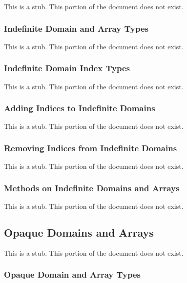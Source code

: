 This is a stub.  This portion of the document does not exist.

\subsubsection{Indefinite Domain and Array Types}
\label{Indefinite_Domain_and_Array_Types}

This is a stub.  This portion of the document does not exist.

\subsubsection{Indefinite Domain Index Types}
\label{Indefinite_Domain_Index_Types}

This is a stub.  This portion of the document does not exist.

\subsubsection{Adding Indices to Indefinite Domains}
\label{Adding_Indices_to_Indefinite_Domains}

This is a stub.  This portion of the document does not exist.

\subsubsection{Removing Indices from Indefinite Domains}
\label{Removing_Indices_from_Indefinite_Domains}

This is a stub.  This portion of the document does not exist.

\subsubsection{Methods on Indefinite Domains and Arrays}
\label{Methods_on_Indefinite_Domains_and_Arrays}

This is a stub.  This portion of the document does not exist.

\subsection{Opaque Domains and Arrays}
\label{Opaque_Domains_and_Arrays}

This is a stub.  This portion of the document does not exist.

\subsubsection{Opaque Domain and Array Types}
\label{Opaque_Domain_and_Array_Types}


